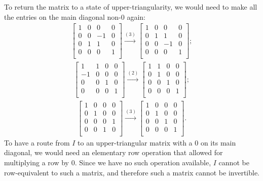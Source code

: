 \documentclass[12pt]{article}
\begin{document}
\begin{enumerate}
    To return the matrix to a state of upper-triangularity, we
    would need to make all the entries on the main diagonal
    non-$0$ again:
    \begin{align*}
      \begin{bmatrix}
        1 & 0 & 0  & 0\\
        0 & 0 & -1 & 0\\
        0 & 1 & 1  & 0\\
        0 & 0 & 0  & 1\\
      \end{bmatrix}
      \xrightarrow{(3)}
      \begin{bmatrix}
        1 & 0 & 0  & 0\\
        0 & 1 & 1  & 0\\
        0 & 0 & -1 & 0\\
        0 & 0 & 0  & 1\\
      \end{bmatrix};
    \end{align*}
    \begin{align*}
      \begin{bmatrix}
        1  & 1 & 0 & 0\\
        -1 & 0 & 0 & 0\\
        0  & 0 & 1 & 0\\
        0  & 0 & 0 & 1\\
      \end{bmatrix}
      \xrightarrow{(2)}
      \begin{bmatrix}
        1  & 1 & 0 & 0\\
        0  & 1 & 0 & 0\\
        0  & 0 & 1 & 0\\
        0  & 0 & 0 & 1\\
      \end{bmatrix};
    \end{align*}
    \begin{align*}
      \begin{bmatrix}
        1 & 0 & 0 & 0\\
        0 & 1 & 0 & 0\\
        0 & 0 & 0 & 1\\
        0 & 0 & 1 & 0\\
      \end{bmatrix}
      \xrightarrow{(3)}
      \begin{bmatrix}
        1 & 0 & 0 & 0\\
        0 & 1 & 0 & 0\\
        0 & 0 & 1 & 0\\
        0 & 0 & 0 & 1\\
      \end{bmatrix}.
    \end{align*}
    To have a route from $I$ to an upper-triangular matrix with a
    $0$ on its main diagonal, we would need an elementary row
    operation that allowed for multiplying a row by $0$. Since we
    have no such operation available, $I$ cannot be
    row-equivalent to such a matrix, and therefore such a matrix
    cannot be invertible.


\end{enumerate}
\end{document}
